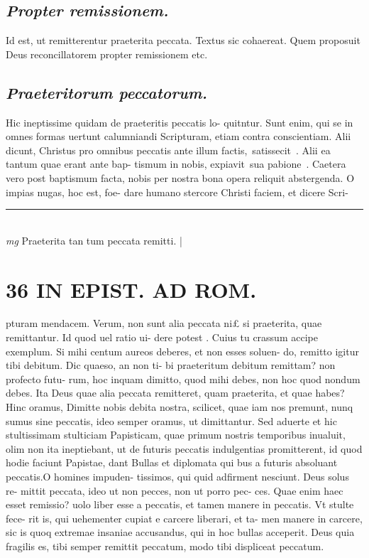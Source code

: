 \documentclass{article}
\begin{document}
\begin{pages}
\subsection*{\textit{Propter remissionem. }}\pstart Id est, ut remitterentur praeterita peccata. Textus sic cohaereat. Quem proposuit Deus reconcillatorem propter remissionem etc.   \pend
{}
{}
\subsection*{\textit{Praeteritorum peccatorum. }}\pstart Hic ineptissime quidam de praeteritis peccatis lo- quitntur. Sunt enim, qui se in omnes formas uertunt calumniandi Scripturam, etiam contra conscientiam.  Alii dicunt, Christus pro omnibus peccatis ante illum factis, satissecit . Alii ea tantum quae erant ante bap- tismum in nobis, expiavit sua pabione . Caetera vero post baptismum facta, nobis per nostra bona opera reliquit abstergenda. O impias nugas, hoc est, foe- dare humano stercore Christi faciem, et dicere Scri-  \pend
\vspace{0.5cm}\noindent
\vspace{0.2cm}\rule{1cm}{0.2pt}\\ 
\hspace{0.2cm}\textit{mg}
\footnotesize Praeterita tan tum peccata remitti.  
\normalsize| 
\section*{36 IN EPIST. AD ROM.  }
\marginpar{[ p.]}\pstart pturam mendacem. Verum, non sunt alia peccata ni£ si praeterita, quae remittantur. Id quod uel ratio ui- dere potest . Cuius tu crassum accipe exemplum.  Si mihi centum aureos deberes, et non esses soluen- do, remitto igitur tibi debitum. Dic quaeso, an non ti- bi praeteritum debitum remittam? non profecto futu- rum, hoc inquam dimitto, quod mihi debes, non hoc quod nondum debes. Ita Deus quae alia peccata remitteret, quam praeterita, et quae habes? Hinc oramus, Dimitte nobis debita nostra, scilicet, quae iam nos premunt, nunq sumus sine peccatis, ideo semper oramus, ut dimittantur. Sed aduerte et hic stultissimam stulticiam Papisticam, quae primum nostris temporibus inualuit, olim non ita ineptiebant, ut de futuris peccatis indulgentias promitterent, id quod hodie faciunt Papistae, dant Bullas et diplomata qui bus a futuris absoluant peccatis.O homines impuden- tissimos, qui quid adfirment nesciunt. Deus solus re- mittit peccata, ideo ut non pecces, non ut porro pec- ces. Quae enim haec esset remissio? uolo liber esse a peccatis, et tamen manere in peccatis. Vt stulte fece- rit is, qui uehementer cupiat e carcere liberari, et ta- men manere in carcere, sic is quoq extremae insaniae accusandus, qui in hoc bullas acceperit. Deus quia fragilis es, tibi semper remittit peccatum, modo tibi displiceat peccatum.   \pend
{}
{}

\end{pages}
\end{document}
